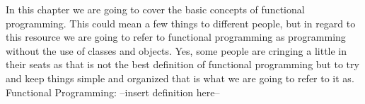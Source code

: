 In this chapter we are going to cover the basic concepts of functional programming. This could mean a few things
to different people, but in regard to this resource we are going to refer to functional programming as programming
without the use of classes and objects. Yes, some people are cringing a little in their seats as that is not the best
definition of functional programming but to try and keep things simple and organized that is what we are going to
refer to it as.
\newline
\\
Functional Programming:
\newline
--insert definition here--

